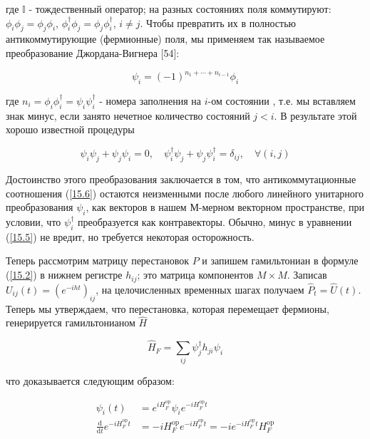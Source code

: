 \documentclass[main.tex]{subfiles}
\begin{document}
где $\mathbb{I}$ - тождественный оператор; на разных состояниях поля коммутируют: $\phi_i\phi_j = \phi_j\phi_i$, $\phi_i^\dagger\phi_j = \phi_j\phi_i^\dagger$, $i \neq j$.
Чтобы превратить их в полностью антикоммутирующие (фермионные) поля, мы применяем так называемое преобразование Джордана-Вигнера [54]:

\begin{equation}\label{15.5}
	\psi_{i}=(-1)^{n_{1}+\cdots+n_{i-1}} \phi_{i}
\end{equation}
          
где $n_i = \phi_i \phi_i^\dagger = \psi_i \psi_i^\dagger$ - номера заполнения на $i$-ом состоянии , т.е. мы вставляем знак минус, если занято нечетное количество состояний $j<i$. В результате этой хорошо известной процедуры

\begin{equation}\label{15.6}
	\psi_{i} \psi_{j}+\psi_{j} \psi_{i}=0, \quad \psi_{i}^{\dagger} \psi_{j}+\psi_{j} \psi_{i}^{\dagger}=\delta_{i j}, \quad \forall(i, j)
\end{equation}

Достоинство этого преобразования заключается в том, что антикоммутационные соотношения (\ref{15.6}) остаются неизменными после любого линейного унитарного преобразования $\psi_i$, как векторов в нашем М-мерном векторном пространстве, при условии, что $\psi_i^\dagger$ преобразуется как контравекторы. Обычно, минус в уравнении (\ref{15.5}) не вредит, но требуется некоторая осторожность.

Теперь рассмотрим матрицу перестановок $P$ и запишем гамильтониан в формуле (\ref{15.2}) в нижнем регистре $h_{ij}$; это матрица компонентов $M \times M$. Записав $U_{ij}(t) = (e^{-iht})_{ij}$, на целочисленных временных шагах получаем $\hat P_t = \hat U(t)$. Теперь мы утверждаем, что перестановка, которая перемещает фермионы, генерируется гамильтонианом $\hat H$

\begin{equation}\label{15.7}
	\hat H_{F} = \sum_{i j} \psi_{j}^{\dagger} h_{j i} \psi_{i}
\end{equation}

что доказывается следующим образом:             

\begin{equation}\label{15.8}
	\begin{aligned} \psi_{i}(t) &=e^{i H_{F}^{\mathrm{op}}} \psi_{i} e^{-i H_{F}^{\mathrm{op}} t} \\ \frac{\mathrm{d}}{\mathrm{d} t} e^{-i H_{F}^{\mathrm{op}} t} &=-i H_{F}^{\mathrm{op}} e^{-i H_{F}^{\mathrm{op}} t}=-i e^{-i H_{F}^{\mathrm{op}} t} H_{F}^{\mathrm{op}} \end{aligned}
\end{equation}
                                         
\end{document}
